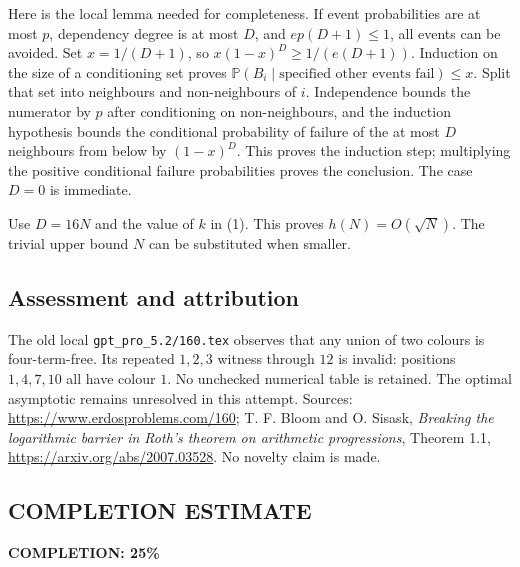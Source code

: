 Here is the local lemma needed for completeness. If event probabilities are at most $p$, dependency degree is at most $D$, and $ep(D+1)\le1$, all events can be avoided. Set $x=1/(D+1)$, so $x(1-x)^D\ge1/(e(D+1))$. Induction on the size of a conditioning set proves
$\mathbb P(B_i\mid\text{specified other events fail})\le x$.
Split that set into neighbours and non-neighbours of $i$. Independence bounds the numerator by $p$ after conditioning on non-neighbours, and the induction hypothesis bounds the conditional probability of failure of the at most $D$ neighbours from below by $(1-x)^D$. This proves the induction step; multiplying the positive conditional failure probabilities proves the conclusion. The case $D=0$ is immediate.

Use $D=16N$ and the value of $k$ in (1). This proves $h(N)=O(\sqrt N)$. The trivial upper bound $N$ can be substituted when smaller.

\subsection*{Assessment and attribution}
The old local \texttt{gpt\_pro\_5.2/160.tex} observes that any union of two colours is four-term-free. Its repeated $1,2,3$ witness through $12$ is invalid: positions $1,4,7,10$ all have colour $1$. No unchecked numerical table is retained. The optimal asymptotic remains unresolved in this attempt.
Sources: \url{https://www.erdosproblems.com/160}; T. F. Bloom and O. Sisask, \emph{Breaking the logarithmic barrier in Roth's theorem on arithmetic progressions}, Theorem 1.1, \url{https://arxiv.org/abs/2007.03528}. No novelty claim is made.
\subsection*{COMPLETION ESTIMATE}
\textbf{COMPLETION: 25\%}
